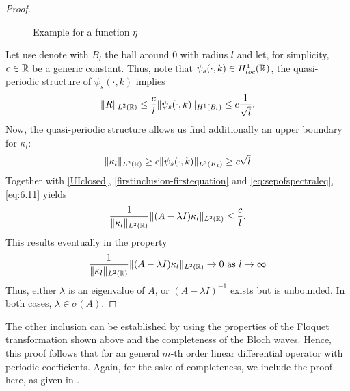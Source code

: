 \begin{theorem}
\begin{proof}
\begin{figure}[!ht] \centering
	\caption{Example for a function $\eta$} 
\end{figure}		
		
		Let use denote with $B_{l}$ the ball around $0$ with radius $l$ and let, for simplicity, $c \in \mathbb{R}$ be a generic constant. Thus, note that $\psi_{s}(\cdot, k) \in H^{1}_{loc}(\mathbb{R})$, the quasi-periodic structure of $\psi_{s}(\cdot, k)$ implies
		\begin{equation}
			 \| R \|_{L^{2}(\mathbb{R})} \leq \frac{c}{l} \| \psi_{s}(\cdot, k) \|_{H^{1}(B_{l})} \leq c \frac{1}{\sqrt{l}}. \label{eq:estimofR}
		\end{equation}
		Now, the quasi-periodic structure allows us find additionally an upper boundary for $\kappa_{l}$:
		\begin{equation}
			\| \kappa_{l} \|_{L^{2}(\mathbb{R})} \geq c \| \psi_{s}(\cdot, k) \|_{L^{2}(K_{l})} \geq c \sqrt{l} \label{eq:6.11}
		\end{equation} 
		Together with \eqref{UIclosed}, \eqref{firstinclusion-firstequation} and \eqref{eq:sepofspectraleq}, \eqref{eq:6.11} yields
		\[ \frac{1}{\|\kappa_{l}\|_{L^{2}(\mathbb{R})}}\| (A - \lambda I) \kappa_{l} \|_{L^{2}(\mathbb{R})} \leq \frac{c}{l}. \]
		This results eventually in the property
			\[ \frac{1}{\|\kappa_{l} \|_{L^{2}(\mathbb{R})}} \| (A - \lambda I) \kappa_{l} \|_{L^{2}(\mathbb{R})} \rightarrow 0 \text{ as } l \rightarrow \infty \]
		Thus, either $\lambda$ is an eigenvalue of $A$, or $(A - \lambda I)^{-1}$ exists but is unbounded. In both cases, $\lambda \in \sigma(A)$.
	\end{proof}
\end{theorem}	

The other inclusion can be established by using the properties of the Floquet transformation shown above and the completeness of the Bloch waves. Hence, this proof follows that for an general $m$-th order linear differential operator with periodic coefficients. Again, for the sake of completeness, we include the proof here, as given in \cite[section 3.6]{dorfler2011photonic}.

